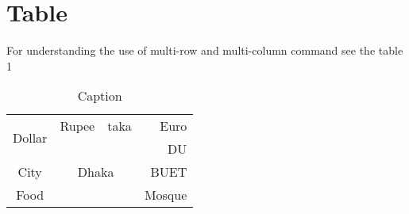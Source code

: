 \documentclass{article}
\begin{document}
\section{Table}
For understanding the use of multi-row and multi-column command see the table 1
\begin{table}[h]
    \centering
    \begin{tabular}{|c|c|c|r|}
        \hline
        \multirow{2}{*}{Dollar} & Rupee & taka & Euro \\
        \cline{2-4}
        & \multicolumn{2}{c|}{\multirow{3}{*}{Dhaka}} & DU \\
        \cline{4-4}
        City & \multicolumn{2}{c}{} & \multicolumn{1}{r|}{BUET} \\
        \cline{1-1}
        \cline{4-4}
        Food & \multicolumn{2}{c|}{} & Mosque \\
        \hline
    \end{tabular}
    \caption{Caption}
    \label{tab:my_label}
\end{table}
\end{document}
